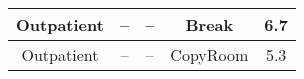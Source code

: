 \begin{table}
\begin{tabular}{|c|c|c|c|c|}
Outpatient             & --                      & --                                                                                                            & Break                             & 6.7                                                                                                            \\ \hline
Outpatient             & --                      & --                                                                                                            & CopyRoom                          & 5.3                                                                                                            \\ \hline
\end{tabular}
\end{table}